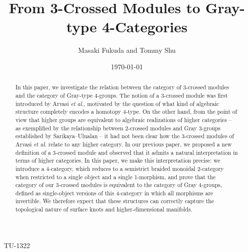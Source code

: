 \documentclass[11pt, reqno]{amsart} %
\title{From 3-Crossed Modules to Gray-type 4-Categories}
\author{Masaki Fukuda and Tommy Shu}
\date{\today}
\theoremstyle{definition}
\theoremstyle{remark}
\numberwithin{equation}{section}
\begin{document}
\begin{flushright}
TU-1322 \\
\vspace{2em}
\end{flushright}

\begin{abstract}
  In this paper, we investigate the relation between the category of 3-crossed modules and the category of Gray-type 4-groups. The notion of a 3-crossed module was first introduced by Arvasi \textit{et al.}, motivated by the question of what kind of algebraic structure completely encodes a homotopy 4-type. On the other hand, from the point of view that higher groups are equivalent to algebraic realizations of higher categories -- as exemplified by the relationship between 2-crossed modules and Gray 3-groups established by Sarikaya--Ulualan -- it had not been clear how the 3-crossed modules of Arvasi \textit{et al.} relate to any higher category. In our previous paper, we proposed a new definition of a 3-crossed module and observed that it admits a natural interpretation in terms of higher categories. In this paper, we make this interpretation precise: we introduce a 4-category, which reduces to a semistrict braided monoidal 2-category when restricted to a single object and a single 1-morphism, and prove that the category of our 3-crossed modules is equivalent to the category of Gray 4-groups, defined as single-object versions of this 4-category in which all morphisms are invertible. We therefore expect that these structures can correctly capture the topological nature of surface knots and higher-dimensional manifolds.
\end{abstract}

\maketitle


\tableofcontents
\clearpage
\end{document}
